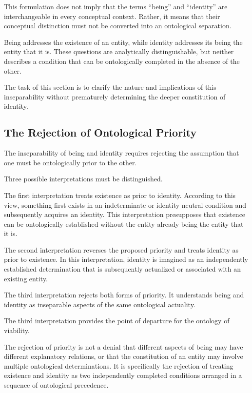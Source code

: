 This formulation does not imply that the terms
``being'' and ``identity'' are interchangeable in
every conceptual context. Rather, it means that
their conceptual distinction must not be converted
into an ontological separation.

Being addresses the existence of an entity, while
identity addresses its being the entity that it is.
These questions are analytically distinguishable,
but neither describes a condition that can be
ontologically completed in the absence of the other.

The task of this section is to clarify the nature
and implications of this inseparability without
prematurely determining the deeper constitution
of identity.



\subsection{The Rejection of Ontological Priority}
\label{subsec:rejection-of-ontological-priority}

The inseparability of being and identity requires
rejecting the assumption that one must be
ontologically prior to the other.

Three possible interpretations must be distinguished.

The first interpretation treats existence as prior
to identity. According to this view, something first
exists in an indeterminate or identity-neutral
condition and subsequently acquires an identity.
This interpretation presupposes that existence can
be ontologically established without the entity
already being the entity that it is.

The second interpretation reverses the proposed
priority and treats identity as prior to existence.
In this interpretation, identity is imagined as
an independently established determination that
is subsequently actualized or associated with an
existing entity.

The third interpretation rejects both forms of
priority. It understands being and identity as
inseparable aspects of the same ontological
actuality.

The third interpretation provides the point of
departure for the ontology of viability.

The rejection of priority is not a denial that
different aspects of being may have different
explanatory relations, or that the constitution
of an entity may involve multiple ontological
determinations. It is specifically the rejection
of treating existence and identity as two
independently completed conditions arranged in
a sequence of ontological precedence.

